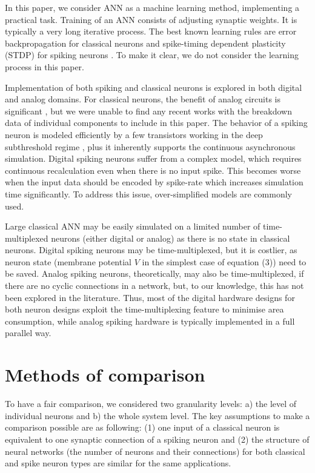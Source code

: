 \documentclass[conference, compsoc]{IEEEtran}
\begin{document}
In this paper, we consider ANN as a machine learning method, implementing a practical task. Training of an ANN consists of adjusting synaptic weights. It is typically a very long iterative process. The best known learning rules are error backpropagation for classical neurons \cite{Backpropagation} and spike-timing dependent plasticity (STDP) for spiking neurons \cite{STDP}. To make it clear, we do not consider the learning process in this paper.

Implementation of both spiking and classical neurons is explored in both digital and analog domains. For classical neurons, the benefit of analog circuits is significant \cite{Esmaeilzadeh:Approximate,Esmaeilzadeh:Approximate_analog}, but we were unable to find any recent works with the breakdown data of individual components to include in this paper. The behavior of a spiking neuron is modeled efficiently by a few transistors working in the deep subthreshold regime \cite{Indiveri,Phong,HardwareOrAnalog,Wijekoon_compact_silicon_circuit,Energy-Efficient-Neuron}, plus it inherently supports  the continuous asynchronous simulation. Digital spiking neurons suffer from a complex model, which requires continuous recalculation even when there is no input spike. This becomes worse when the input data should be encoded by spike-rate which increases simulation time significantly. To address this issue, over-simplified models are commonly used. 

Large classical ANN may be easily simulated on a limited number of time-multiplexed neurons (either digital or analog) as there is no state in classical neurons. Digital spiking neurons may be time-multiplexed, but it is costlier, as neuron state (membrane potential $ V $ in the simplest case of equation (3)) need to be saved. Analog spiking neurons, theoretically, may also be time-multiplexed, if there are no cyclic connections in a network, but, to our knowledge, this has not been explored in the literature. Thus, most of the digital hardware designs for both neuron designs exploit the time-multiplexing feature to minimise area consumption, while analog spiking hardware is typically implemented in a full parallel way.


\section{Methods of comparison}
To have a fair comparison, we considered two granularity levels: a) the level of individual neurons and b) the whole system level. The key assumptions to make a comparison possible are as following: (1) one input of a classical neuron is equivalent to one synaptic connection of a spiking neuron and (2) the structure of neural networks (the number of neurons and their connections) for both classical and spike neuron types are similar for the same applications.
\end{document}
